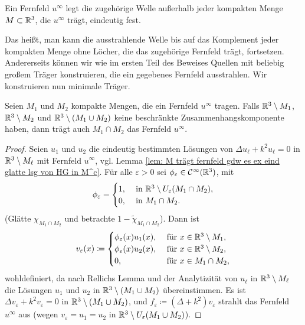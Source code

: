 \begin{no counter bemerkung}
	Ein Fernfeld \(u^\infty\) legt die zugehörige Welle außerhalb jeder kompakten Menge \(M\subset\mathbb{R}^3\), die \(u^\infty\) trägt, eindeutig fest.
\end{no counter bemerkung}
Das heißt, man kann die ausstrahlende Welle bis auf das Komplement jeder kompakten Menge ohne Löcher, die das zugehörige Fernfeld trägt, fortsetzen. Andererseits können wir wie im ersten Teil des Beweises Quellen mit beliebig großem Träger konstruieren, die ein gegebenes Fernfeld ausstrahlen. Wir konstruieren nun \glqq{}minimale\grqq{} Träger.
\begin{lem}\label{lem: zusammenhang kompakte mengen beschränkte zusammenhangskomponente}
	Seien \(M_1\) und \(M_2\) kompakte Mengen, die ein Fernfeld \(u^\infty\) tragen. Falls \(\mathbb{R}^3\setminus M_1\), \(\mathbb{R}^3\setminus M_2\) und \(\mathbb{R}^3\setminus(M_1\cup M_2)\) keine beschränkte Zusammenhangskomponente haben, dann trägt auch \(M_1\cap M_2\) das Fernfeld \(u^\infty\).\vspace{2mm}
\end{lem}
\begin{proof}
	Seien \(u_1\) und \(u_2\) die eindeutig bestimmten Lösungen von \(\Delta u_\ell+k^2u_\ell=0\) in \(\mathbb{R}^3\setminus M_\ell\) mit Fernfeld \(u^\infty\), vgl. Lemma \ref{lem: M trägt fernfeld gdw es ex eind glatte lsg von HG in M^c}. Für alle \(\varepsilon>0\) sei \(\phi_\varepsilon\in\mathcal{C}^\infty(\mathbb{R}^3)\), mit
	\begin{equation*}
		\phi_\varepsilon=
		\begin{cases}
			1,&\text{ in }\mathbb{R}^3\setminus U_\varepsilon(M_1\cap M_2),\\
			0,&\text{ in }M_1\cap M_2.
		\end{cases}
	\end{equation*}
	(Glätte \(\chi_{M_1\cap M_2}\) und betrachte \(1-\widetilde{\chi}_{M_1\cap M_2}\)). Dann ist
	\begin{equation*}
		v_\varepsilon(x)\coloneqq
		\begin{cases}
			\phi_\varepsilon(x)u_1(x),&\text{ für }x\in\mathbb{R}^3\setminus M_1,\\
			\phi_\varepsilon(x)u_2(x),&\text{ für }x\in\mathbb{R}^3\setminus M_2,\\
			0,&\text{ für }x\in M_1\cap M_2,
		\end{cases}
	\end{equation*}
	wohldefiniert, da nach Rellichs Lemma und der Analytizität von \(u_\ell\) in \(\mathbb{R}^3\setminus M_\ell\) die Lösungen \(u_1\) und \(u_2\) in \(\mathbb{R}^3\setminus(M_1\cup M_2)\) übereinstimmen. Es ist \(\Delta v_\varepsilon+k^2 v_\varepsilon=0\) in \(\mathbb{R}^3\setminus(M_1\cup M_2)\), und \(f_\varepsilon\coloneqq(\Delta+k^2)v_\varepsilon\) strahlt das Fernfeld \(u^\infty\) aus (wegen \(v_\varepsilon=u_1=u_2\) in \(\mathbb{R}^3\setminus U_\varepsilon(M_1\cup M_2)\)).
\end{proof}
